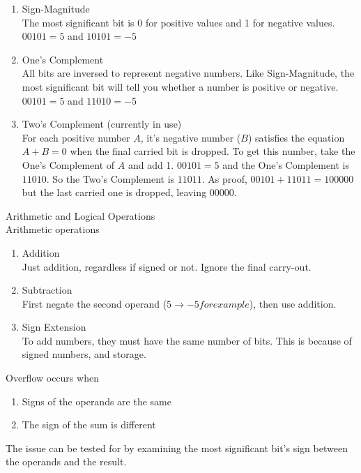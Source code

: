 \documentclass{article}
\begin{document}
\begin{enumerate}
  \item {
  Sign-Magnitude\\
  The most significant bit is 0 for positive values and 1 for negative values.\\
  $00101 = 5$ and $10101 = -5$
  }
  \item {
  One's Complement\\
  All bits are inversed to represent negative numbers. Like Sign-Magnitude, the most significant bit will tell you whether a number is positive or negative.\\
  $00101 = 5$ and $11010 = -5$
  }
  \item {
  Two's Complement (currently in use)\\
  For each positive number $A$, it's negative number ($B$) satisfies the equation $A + B = 0$ when the final carried bit is dropped. To get this number, take the One's Complement of $A$ and add 1.
  $00101 = 5$ and the One's Complement is $11010$. So the Two's Complement is $11011$. As proof, $00101 + 11011 = 100000$ but the last carried one is dropped, leaving $00000$.
  }
\end{enumerate}

\noindent
\Large
Arithmetic and Logical Operations\\
\normalsize
\noindent
Arithmetic operations
\begin{enumerate}
  \item {Addition\\Just addition, regardless if signed or not. Ignore the final carry-out.}
  \item {Subtraction\\First negate the second operand ($5 \to -5 for example$), then use addition.}
  \item {Sign Extension\\To add numbers, they must have the same number of bits. This is because of signed numbers, and storage.}
\end{enumerate}

\noindent
Overflow occurs when
\begin{enumerate}
  \item Signs of the operands are the same
  \item The sign of the sum is different
\end{enumerate}
\noindent
The issue can be tested for by examining the most significant bit's sign between the operands and the result.
\end{document}
